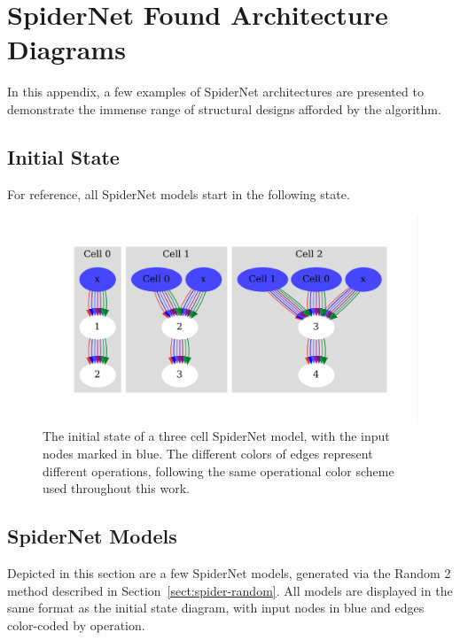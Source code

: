 
\graphicspath{{Chapters/appendix_spider/figures/}}
\chapter{SpiderNet Found Architecture Diagrams} \label{chapter:appendix_spider}
\vspace{-1cm}
In this appendix, a few examples of SpiderNet architectures are presented to demonstrate the immense range
of structural designs afforded by the algorithm.

\section{Initial State}
For reference, all SpiderNet models start in the following state.
\begin{figure}[ht!]
    \centering
  \includegraphics[width=.95\textwidth, trim={0 1cm 0 1cm}, clip]{initial_darkerblue}
    \caption[The initial state of a three cell SpiderNet model]{The initial state of a three cell SpiderNet model, with the input nodes marked in blue. The different
    colors of edges represent different operations, following the same operational color scheme used throughout
    this work.}
    \label{fig:spiderappendix_multiin_initialization}
\end{figure}

\section{SpiderNet Models}
Depicted in this section are a few SpiderNet models, generated via the Random 2 method described in
Section~\ref{sect:spider-random}. All models are displayed in the same format as the initial state diagram, with
input nodes in blue and edges color-coded by operation.

